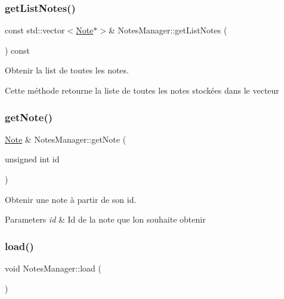 \subsubsection{\texorpdfstring{get\+List\+Notes()}{getListNotes()}}
{\footnotesize\ttfamily const std\+::vector$<$\hyperlink{class_note}{Note}$\ast$$>$\& Notes\+Manager\+::get\+List\+Notes (\begin{DoxyParamCaption}{ }\end{DoxyParamCaption}) const\hspace{0.3cm}{\ttfamily [inline]}}



Obtenir la list de toutes les notes. 

Cette méthode retourne la liste de toutes les notes stockées dans le vecteur \mbox{\label{class_notes_manager_a559c0b690aa23fb568b4a8e53a6f51cc}} 
\subsubsection{\texorpdfstring{get\+Note()}{getNote()}}
{\footnotesize\ttfamily \hyperlink{class_note}{Note} \& Notes\+Manager\+::get\+Note (\begin{DoxyParamCaption}\item[{unsigned int}]{id }\end{DoxyParamCaption})}



Obtenir une note à partir de son id. 


\begin{DoxyParams}{Parameters}
{\em id} & Id de la note que l\textquotesingle{}on souhaite obtenir \\
\hline
\end{DoxyParams}
\mbox{\label{class_notes_manager_ad4fb2de50633dd25b71024343341cd64}} 
\subsubsection{\texorpdfstring{load()}{load()}}
{\footnotesize\ttfamily void Notes\+Manager\+::load (\begin{DoxyParamCaption}{ }\end{DoxyParamCaption})}



